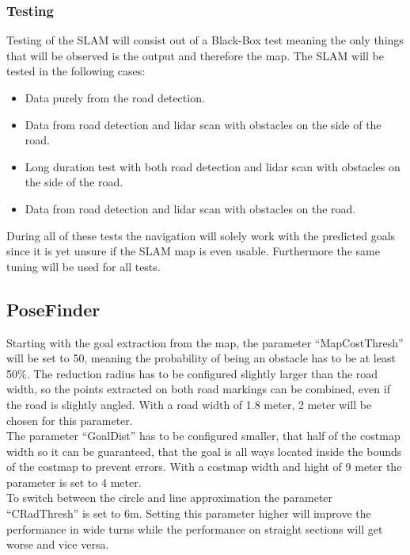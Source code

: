 \subsubsection{Testing}
Testing of the SLAM will consist out of a Black-Box test meaning the only things that will be observed is the output and therefore the map.
The SLAM will be tested in the following cases:
\begin{itemize}
	\item Data purely from the road detection.
	\item Data from road detection and lidar scan with obstacles on the side of the road.
	\item Long duration test with both road detection and lidar scan with obstacles on the side of the road.
	\item Data from road detection and lidar scan with obstacles on the road.
\end{itemize}

During all of these tests the navigation will solely work with the predicted goals since it is yet unsure if the SLAM map is even usable. Furthermore the same tuning will be used for all tests.\\



\subsection{PoseFinder}

Starting with the goal extraction from the map, the parameter ``MapCostThresh'' will be set to 50, meaning the probability of being an obstacle has to be at least 50\%. The reduction radius has to be configured slightly larger than the road width, so the points extracted on both road markings can be combined, even if the road is slightly angled. With a road width of 1.8 meter, 2 meter will be chosen for this parameter.\\

The parameter ``GoalDist'' has to be configured smaller, that half of the costmap width so it can be guaranteed, that the goal is all ways located inside the bounds of the costmap to prevent errors. With a costmap width and hight of 9 meter the parameter is set to 4 meter.\\

To switch between the circle and line approximation the parameter ``CRadThresh'' is set to 6m. Setting this parameter higher will improve the performance in wide turns while the performance on straight sections will get worse and vice versa.\\

